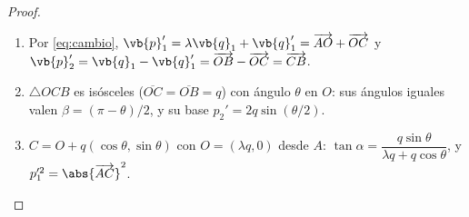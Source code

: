 \begin{proof}
\begin{enumerate}
  \item Por \eqref{eq:cambio}, $\vb{p}_{1}'=\lambda\vb{q}_{1}+\vb{q}_{1}'=\overrightarrow{AO}+\overrightarrow{OC}$ y
        $\vb{p}_{2}'=\vb{q}_{1}-\vb{q}_{1}'=\overrightarrow{OB}-\overrightarrow{OC}=\overrightarrow{CB}$.
  \item $\triangle OCB$ es isósceles ($\overline{OC}=\overline{OB}=q$) con ángulo $\theta$ en $O$: sus
        ángulos iguales valen $\beta=(\pi-\theta)/2$, y su base $p_{2}'=2q\sin(\theta/2)$.
  \item $C=O+q(\cos\theta,\sin\theta)$ con $O=(\lambda q,0)$ desde $A$:
        $\tan\alpha=\dfrac{q\sin\theta}{\lambda q+q\cos\theta}$, y $p_{1}'^{2}=\abs{\overrightarrow{AC}}^{2}$.\qedhere
\end{enumerate}
\end{proof}

